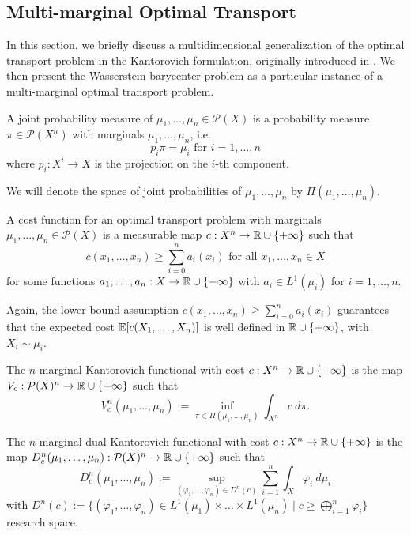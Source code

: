 \documentclass[../main.tex]{subfiles}
\begin{document}
\subsection{Multi-marginal Optimal Transport}
In this section, we briefly discuss a multidimensional generalization of the optimal transport problem in the Kantorovich formulation, originally introduced in \cite{gangbo1998optimal}. We then present the Wasserstein barycenter problem as a particular instance of a multi-marginal optimal transport problem.

\begin{definition}
    A joint probability measure of $\mu_1, \dots, \mu_n\in\mathcal{P}(X)$ is a probability measure $\pi\in\mathcal{P}(X^n)$ with marginals $\mu_1, \dots, \mu_n$, i.e.
    $$
    p_i\pi = \mu_i \text{ for } i=1, \dots, n
    $$
    where $p_i: X^i \to X$ is the projection on the $i$-th component.
\end{definition}
We will denote the space of joint probabilities of $\mu_1, \dots, \mu_n$ by $\Pi(\mu_1, \dots, \mu_n)$. 

\begin{definition}
    A cost function for an optimal transport problem with marginals $\mu_1, \dots, \mu_n\in\mathcal{P}(X)$ is a measurable map $c: X^n\to \mathbb{R}\cup\{+\infty\}$ such that
    $$
    c(x_1, \dots, x_n)
    \geq
    \sum_{i=0}^n a_i(x_i) \text { for all } x_1, \dots, x_n\in X
    $$
    for some functions $a_1, \dots, a_n : X\to \mathbb{R}\cup\{-\infty\}$ with $a_i\in L^1(\mu_i)$ for $i=1, \dots, n$.
\end{definition}
Again, the lower bound assumption $c(x_1, \dots, x_n)\geq\sum_{i=0}^n a_i(x_i)$ guarantees that the expected cost $\mathbb{E}[c(X_1,\dots, X_n)]$ is well defined in $\mathbb{R}\cup\{+\infty\}$, with $X_i\sim \mu_i$.

\begin{definition}
    The $n$-marginal Kantorovich functional with cost $c: X^n \to \mathbb{R}\cup\{+\infty\}$ is the map $V_c : \mathcal{P}(X)^n \to \mathbb{R}\cup\{+\infty\}$ such that
    $$
    V^n_c(\mu_1, \dots, \mu_n) := \inf_{\pi\in \Pi(\mu_1, \dots, \mu_n)} \int_{X^n} c \ d\pi.
    $$
\end{definition}

\begin{definition}
    The $n$-marginal dual Kantorovich functional with cost $c: X^n\to \mathbb{R}\cup\{+\infty\}$ is the map $D^n_c(\mu_1, \dots, \mu_n) : \mathcal{P}(X)^n \to \mathbb{R}\cup\{+\infty\}$ such that 
    $$
    D^n_c(\mu_1, \dots, \mu_n) := \sup_{(\varphi_1, \dots, \varphi_n)\in D^n(c)} \sum_{i=1}^n \int_X \varphi_i \ d\mu_i
    $$
    with $D^n(c) := \{(\varphi_1, \dots, \varphi_n)\in L^1(\mu_1)\times\dots\times L^1(\mu_n) \mid c \geq \bigoplus_{i=1}^n \varphi_i\}$ research space.
\end{definition}
\end{document}
